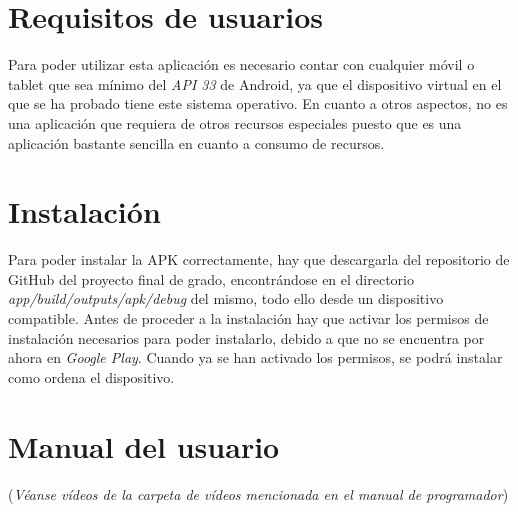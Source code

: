 
\section{Requisitos de usuarios}

Para poder utilizar esta aplicación es necesario contar con cualquier móvil o
tablet que sea mínimo del \textit{API 33} de Android, ya que el dispositivo
virtual en el que se ha probado tiene este sistema operativo. En cuanto a otros
aspectos, no es una aplicación que requiera de otros recursos especiales puesto
que es una aplicación bastante sencilla en cuanto a consumo de recursos.

\section{Instalación}
Para poder instalar la APK correctamente, hay que descargarla del repositorio de
GitHub del proyecto final de grado, encontrándose en el directorio
\textit{app/build/outputs/apk/debug} del mismo, todo ello desde un dispositivo
compatible. Antes de proceder a la instalación hay que activar los permisos de
instalación necesarios para poder instalarlo, debido a que no se encuentra por
ahora en \textit{Google Play}. Cuando ya se han activado los permisos, se podrá
instalar como ordena el dispositivo. 

\section{Manual del usuario}
(\textit{Véanse vídeos de la carpeta de vídeos mencionada en el manual de programador})

